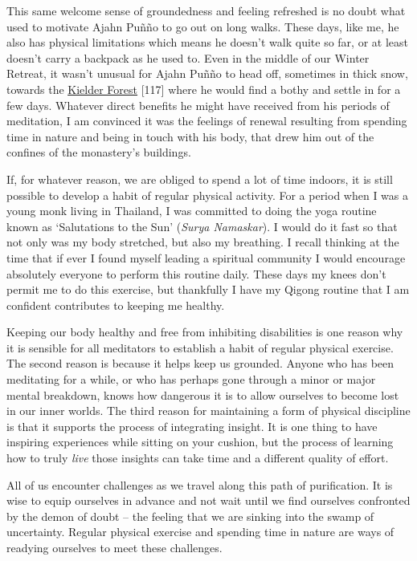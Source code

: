 This same welcome sense of groundedness and feeling refreshed is no
doubt what used to motivate Ajahn Puñño to go out on long walks. These
days, like me, he also has physical limitations which means he doesn't
walk quite so far, or at least doesn't carry a backpack as he used to.
Even in the middle of our Winter Retreat, it wasn't unusual for Ajahn
Puñño to head off, sometimes in thick snow, towards the
\href{https://en.wikipedia.org/wiki/Kielder_Forest}{\underline{Kielder
Forest}} {[}117{]} where he would find a bothy and settle in for a few
days. Whatever direct benefits he might have received from his periods
of meditation, I am convinced it was the feelings of renewal resulting
from spending time in nature and being in touch with his body, that drew
him out of the confines of the monastery's buildings.

If, for whatever reason, we are obliged to spend a lot of time indoors,
it is still possible to develop a habit of regular physical activity.
For a period when I was a young monk living in Thailand, I was committed
to doing the yoga routine known as `Salutations to the Sun' (\emph{Surya
Namaskar}). I would do it fast so that not only was my body stretched,
but also my breathing. I recall thinking at the time that if ever I
found myself leading a spiritual community I would encourage absolutely
everyone to perform this routine daily. These days my knees don't permit
me to do this exercise, but thankfully I have my Qigong routine that I
am confident contributes to keeping me healthy.

Keeping our body healthy and free from inhibiting disabilities is one
reason why it is sensible for all meditators to establish a habit of
regular physical exercise. The second reason is because it helps keep us
grounded. Anyone who has been meditating for a while, or who has perhaps
gone through a minor or major mental breakdown, knows how dangerous it
is to allow ourselves to become lost in our inner worlds. The third
reason for maintaining a form of physical discipline is that it supports
the process of integrating insight. It is one thing to have inspiring
experiences while sitting on your cushion, but the process of learning
how to truly \emph{live} those insights can take time and a different
quality of effort.

All of us encounter challenges as we travel along this path of
purification. It is wise to equip ourselves in advance and not wait
until we find ourselves confronted by the demon of doubt -- the feeling
that we are sinking into the swamp of uncertainty. Regular physical
exercise and spending time in nature are ways of readying ourselves to
meet these challenges.

